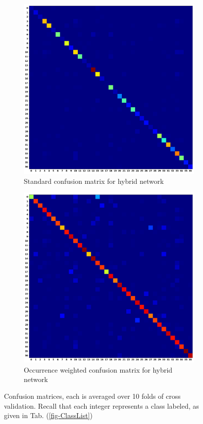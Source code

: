 \documentclass[12pt,letterpaper]{article}
\begin{document}
\begin{figure}[H]
	\begin{subfigure}[b]{0.45\textwidth}
	\centering
	\includegraphics[scale=0.18]{../FiguresMetrics/XValAlphaCLF_Avg_Standard_Confusion}
	\caption{Standard confusion matrix for hybrid network}
	\end{subfigure}
	\hfill
	\begin{subfigure}[b]{0.45\textwidth}
	\centering
	\includegraphics[scale=0.18]{../FiguresMetrics/XValAlphaCLF_Avg_Hits_Weighted_Confusion}
	\caption{Occurrence weighted confusion matrix for hybrid network}
	\end{subfigure}	
	\caption{Confusion matrices, each is averaged over 10 folds of cross validation. Recall that each integer represents a class labeled, as given in Tab. (\ref{fig-ClassList})}
	\label{fig-MultimodalConfs}
\end{figure}
\end{document}
